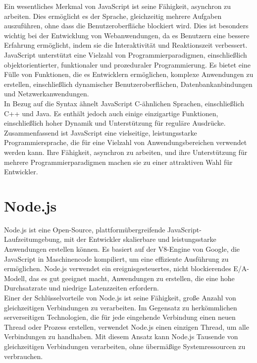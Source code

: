 Ein wesentliches Merkmal von JavaScript ist seine Fähigkeit, asynchron zu arbeiten. Dies ermöglicht es der Sprache, gleichzeitig mehrere Aufgaben auszuführen, ohne dass die Benutzeroberfläche blockiert wird. Dies ist besonders wichtig bei der Entwicklung von Webanwendungen, da es Benutzern eine bessere Erfahrung ermöglicht, indem sie die Interaktivität und Reaktionszeit verbessert.\\

JavaScript unterstützt eine Vielzahl von Programmierparadigmen, einschließlich objektorientierter, funktionaler und prozeduraler Programmierung. Es bietet eine Fülle von Funktionen, die es Entwicklern ermöglichen, komplexe Anwendungen zu erstellen, einschließlich dynamischer Benutzeroberflächen, Datenbankanbindungen und Netzwerkanwendungen.\\

In Bezug auf die Syntax ähnelt JavaScript C-ähnlichen Sprachen, einschließlich C++ und Java. Es enthält jedoch auch einige einzigartige Funktionen, einschließlich hoher Dynamik und Unterstützung für reguläre Ausdrücke.\\

Zusammenfassend ist JavaScript eine vielseitige, leistungsstarke Programmiersprache, die für eine Vielzahl von Anwendungsbereichen verwendet werden kann. Ihre Fähigkeit, asynchron zu arbeiten, und ihre Unterstützung für mehrere Programmierparadigmen machen sie zu einer attraktiven Wahl für Entwickler.\\
 
\section{Node.js}
Node.js ist eine Open-Source, plattformübergreifende JavaScript-Laufzeitumgebung, mit der Entwickler skalierbare und leistungsstarke Anwendungen erstellen können. Es basiert auf der V8-Engine von Google, die JavaScript in Maschinencode kompiliert, um eine effiziente Ausführung zu ermöglichen. Node.js verwendet ein ereignisgesteuertes, nicht blockierendes E/A-Modell, das es gut geeignet macht, Anwendungen zu erstellen, die eine hohe Durchsatzrate und niedrige Latenzzeiten erfordern.\cite{.06.03.2023}\\

Einer der Schlüsselvorteile von Node.js ist seine Fähigkeit, große Anzahl von gleichzeitigen Verbindungen zu verarbeiten. Im Gegensatz zu herkömmlichen serverseitigen Technologien, die für jede eingehende Verbindung einen neuen Thread oder Prozess erstellen, verwendet Node.js einen einzigen Thread, um alle Verbindungen zu handhaben. Mit diesem Ansatz kann Node.js Tausende von gleichzeitigen Verbindungen verarbeiten, ohne übermäßige Systemressourcen zu verbrauchen.\cite{Node.js.27.02.2023b}\\


